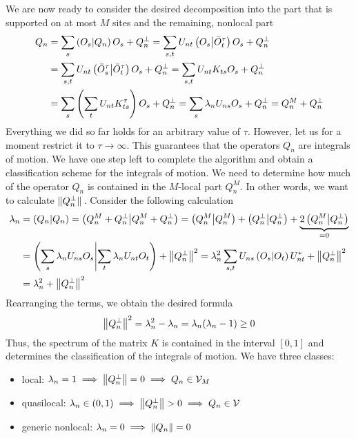We are now ready to consider the desired decomposition into the part that is supported on at most \(M\) sites and the remaining, nonlocal part
\begin{align}
    Q_n &=  \sum_s \left(O_s \middle| Q_n\right)O_s + Q_n^{\perp} = \sum_{s,t} U_{n t}\left(O_{s} \middle| \bar{O}_{t}^{\tau}\right)
    O_{s}+Q_{n}^{\perp} \nonumber \\
    &= \sum_{s,t} U_{n t}\left(\bar{O}_{s}^{\tau} \middle| \bar{O}_{t}^{\tau}\right) O_{s}+Q_{n}^{\perp}
    = \sum_{s,t} U_{n t}K_{ts} O_{s}+Q_{n}^{\perp} \nonumber \\
    &= \sum_s  \left( \sum_t U_{n t}K_{ts}^{\tau}\right) O_{s}+Q_{n}^{\perp} = \sum_{s} 
    \lambda_{n} U_{n s} O_{s}+Q_{n}^{\perp} = Q_{n}^{M}+Q_{n}^{\perp}
    \label{eq:decomposition2}
  \end{align}
  Everything we did so far holds for an
arbitrary value of \(\tau\). However, let us for a moment restrict it to \(\tau\to \infty\).
This guarantees that the operators \(Q_n\) are integrals of motion.
  We have one step left to complete the algorithm and obtain a classification scheme for the
  integrals of motion. We need to determine how much of the operator \(Q_n\) is contained in the
  \(M\)-local part \(Q_n^M\). In other words, we want to calculate \(\norm*{Q_n^{\perp}}\).
  Consider the following calculation
  \begin{align}
    \lambda_n &= \left(Q_n \middle| Q_n\right) = \left(Q_n^M + Q_n^{\perp} \middle| Q_n^M + Q_n^{\perp}\right) = \left(Q_n^M \middle| Q_n^M\right) +
     \left(Q_n^{\perp} \middle| Q_n^{\perp}\right) + \underbrace{2 \left(Q_n^M \middle| Q_n^{\perp}\right)}_{=0} \nonumber \\
     &= \left(\sum_s \lambda_n U_{ns} O_s \middle| \sum_t \lambda_n U_{nt} O_t\right) + \norm{Q_n^{\perp}}^2 =
    \lambda_n^2 \sum_{s,t} U_{ns} \left(O_s \middle| O_t\right) U_{nt}^{\ast} + \norm{Q_n^{\perp}}^2  \nonumber \\
    &=\lambda_n^2 + \norm{Q_n^{\perp}}^2
  \end{align}
  Rearranging the terms, we obtain the desired formula
  \begin{equation}
    \norm{Q_n^{\perp}}^2 = \lambda_n^2 - \lambda_n = \lambda_n (\lambda_n - 1) \geq 0
    \label{eq:liom_norm}
  \end{equation}
Thus, the spectrum of the matrix \(K\) is contained in the interval \([0,1]\) and
 determines the classification of the integrals of motion. We have three classes:
 \begin{itemize}
    \item local: \(\lambda_n = 1 \implies \norm{Q_n^{\perp}} = 0 \implies Q_n \in \mathcal{V}_M\)
    \item quasilocal: \(\lambda_n \in \left(0,1\right) \implies \norm{Q_n^{\perp}} > 0 \implies Q_n \in \mathcal{V} \)
    \item generic nonlocal: \(\lambda_n = 0 \implies \norm{Q_n} = 0\)
  \end{itemize}
